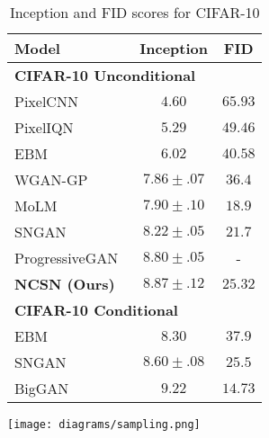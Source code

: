 \documentclass{article}
\begin{document}
\begin{table}\begin{minipage}[b]{0.55\linewidth}
\begin{center}
\begin{adjustbox}{max width=0.8\linewidth}
\begin{tabular}{lcc}
        \toprule
        Model & Inception & FID\\
        \midrule
        \multicolumn{3}{l}{\textbf{CIFAR-10 Unconditional}} \\
        \midrule
        PixelCNN~\cite{van2016conditional} & $4.60$ & $65.93$\\
        PixelIQN~\cite{ostrovski2018autoregressive} & $5.29$ & $49.46$\\
        EBM~\cite{du2019implicit} & $6.02$ & $40.58$ \\
        WGAN-GP~\cite{gulrajani2017improved} & $7.86 \pm .07$ & $36.4$\\
        MoLM~\cite{ravuri2018learning} & $7.90\pm .10$ & $\mathbf{18.9}$\\
        SNGAN~\cite{miyato2018spectral} & $8.22\pm .05$ & $21.7$ \\
        ProgressiveGAN~\cite{karras2018progressive} & $8.80\pm .05$ & - \\
        \textbf{NCSN (Ours)} & {$\mathbf{8.87} \pm .12$} & $25.32$\\
        \midrule
        \multicolumn{3}{l}{\textbf{CIFAR-10 Conditional}}\\
        \midrule
        EBM~\cite{du2019implicit} & $8.30$ & $37.9$ \\
        SNGAN~\cite{miyato2018spectral} & $8.60 \pm .08$ & $25.5$\\
        BigGAN~\cite{brock2018large} & $\mathbf{9.22}$ & $\mathbf{14.73}$\\
        \bottomrule
    \end{tabular} 
\end{adjustbox}
\end{center}
\caption{Inception and FID scores for CIFAR-10} \label{tab:score}
\end{minipage}\hfill
\begin{minipage}[b]{0.45\linewidth}
\begin{center}
\texttt{[image: diagrams/sampling.png]}
\end{center}
\label{fig:sampling}
\end{minipage}
\end{table}
\end{document}
